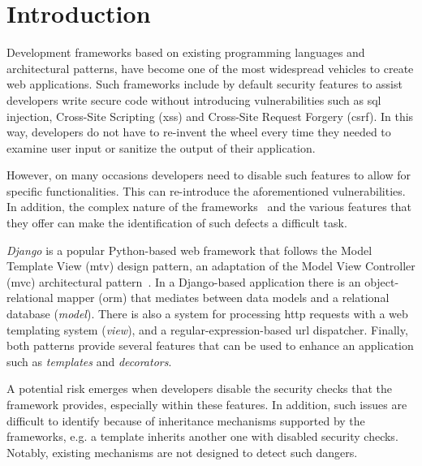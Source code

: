 \section{Introduction}
Development frameworks based on existing
programming languages and architectural patterns,
have become one of the most
widespread vehicles to create web
applications.
Such frameworks include by default
security features to assist
developers write secure code without
introducing vulnerabilities such as
{\sc sql} injection,
Cross-Site Scripting ({\sc xss}) and
Cross-Site Request Forgery ({\sc csrf}).
In this way,
developers do not have to re-invent the wheel every time they needed to examine
user input or sanitize the output of their
application.

However,
on many occasions developers need
to disable such features to
allow for specific functionalities.
This can re-introduce the
aforementioned vulnerabilities.
In addition,
the complex nature of the
frameworks~\cite{OPM15}
and the various features that they offer
can make the identification of
such defects a difficult task.

{\it Django} is a popular Python-based web
framework that follows the Model
Template View ({\sc mtv}) design pattern,
an adaptation of the
Model View Controller ({\sc mvc})
architectural pattern~\cite{GLH03, BD04}.
In a Django-based application
there is an object-relational mapper
({\sc orm}) that mediates between data models
and a relational database ({\it model}).
There is also a system for
processing {\sc http} requests with
a web templating system ({\it view}),
and a regular-expression-based
{\sc url} dispatcher.
Finally,
both patterns provide several features that
can be used to enhance an application such
as {\it templates} and {\it decorators}.

A potential risk emerges when developers
disable the security checks that the
framework provides,
especially within these features.
In addition,
such issues are difficult to identify because
of inheritance mechanisms supported
by the frameworks,
e.g. a template inherits another one with
disabled security checks.
Notably,
existing mechanisms are not designed
to detect such dangers.

